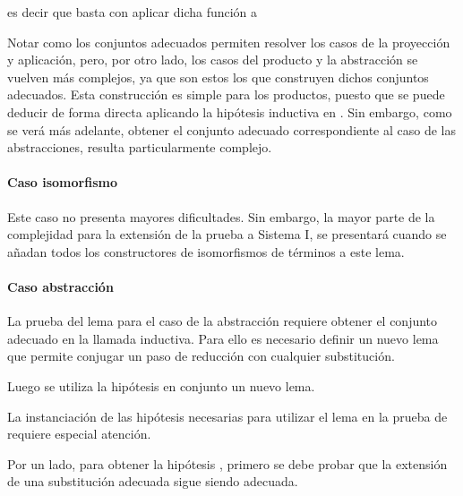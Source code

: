 es decir que basta con aplicar dicha función a 


Notar como los conjuntos adecuados permiten resolver los casos de la proyección y aplicación, pero, por otro lado, los casos del producto y la abstracción se vuelven más complejos, ya que son estos los que construyen dichos conjuntos adecuados.
Esta construcción es simple para los productos, puesto que se puede deducir de forma directa aplicando la hipótesis inductiva en .	
Sin embargo, como se verá más adelante, obtener el conjunto adecuado correspondiente al caso de las abstracciones, resulta particularmente complejo.

\paragraph{Caso isomorfismo}

Este caso no presenta mayores dificultades. Sin embargo, la mayor parte de la complejidad para la extensión de la prueba a Sistema I, se presentará cuando se añadan todos los constructores de isomorfismos de términos a este lema.


\paragraph{Caso abstracción}

La prueba del lema para el caso de la abstracción requiere obtener el conjunto adecuado
en la llamada inductiva.
Para ello es necesario definir un nuevo lema que permite conjugar un paso de reducción con cualquier substitución.


Luego se utiliza la hipótesis  en conjunto un nuevo lema.


La instanciación de las hipótesis necesarias para utilizar el lema en la prueba de  requiere especial atención.

Por un lado, para obtener la hipótesis \snstar {}, primero se debe probar que la extensión de una substitución adecuada sigue siendo adecuada.

